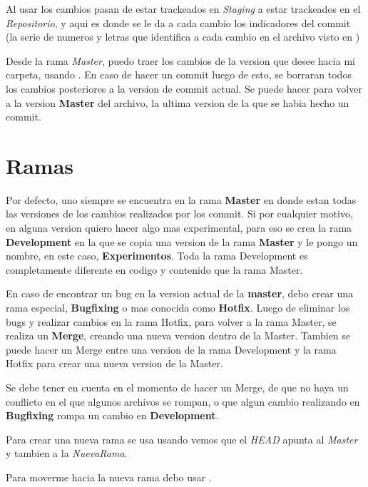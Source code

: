 \documentclass[]{article} %
\begin{document}
Al usar  los cambios pasan de estar trackeados en \textit{Staging} a estar trackeados en el \textit{Repositorio}, y aqui es donde se le da a cada cambio los indicadores del commit (la serie de numeros y letras que identifica a cada cambio en el archivo visto en )

Desde la rama \textit{Master}, puedo traer los cambios de la version que desee hacia mi carpeta, usando .
En caso de hacer un commit luego de esto, se borraran todos los cambios posteriores a la version de commit actual.
Se puede hacer  para volver a la version \textbf{Master} del archivo, la ultima version de la que se habia hecho un commit.

\section*{Ramas}

Por defecto, uno siempre se encuentra en la rama \textbf{Master} en donde estan todas las versiones de los cambios realizados por los commit. Si por cualquier motivo, en alguna version quiero hacer algo mas experimental, para eso se crea la rama \textbf{Development} en la que se copia una version de la rama \textbf{Master} y le pongo un nombre, en este caso, \textbf{Experimentos}. Toda la rama Development es completamente diferente en codigo y contenido que la rama Master.

En caso de encontrar un bug en la version actual de la \textbf{master}, debo crear una rama especial, \textbf{Bugfixing} o mas conocida como \textbf{Hotfix}. Luego de eliminar los bugs y realizar cambios en la rama Hotfix, para volver a la rama Master, se realiza un \textbf{Merge}, creando una nueva version dentro de la Master. Tambien se puede hacer un Merge entre una version de la rama Development y la rama Hotfix para crear una nueva version de la Master.

Se debe tener en cuenta en el momento de hacer un Merge, de que no haya un conflicto en el que algunos archivos se rompan, o que algun cambio realizando en \textbf{Bugfixing} rompa un cambio en \textbf{Development}.

Para crear una nueva rama se usa 
usando  vemos que el \textit{HEAD} apunta al \textit{Master} y tambien a la \textit{NuevaRama}.

Para moverme hacia la nueva rama debo usar .
\end{document}
